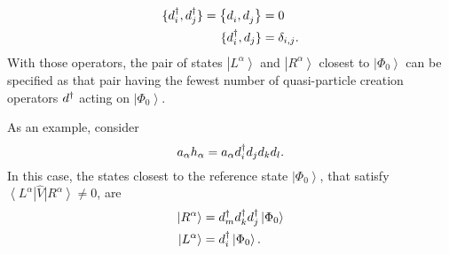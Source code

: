 \begin{align*}
\lbrace d_i^\dagger , d_j^\dagger \rbrace = \left\lbrace d_i^{}, d_j^{} \right\rbrace &= 0 \\
\lbrace d_i^\dagger , d_j \rbrace &= \delta_{i,j}.
\end{align*}
With those operators, the pair of states $\left| L^{\alpha} \right\rangle$ and $\left| R^{\alpha} \right\rangle$ 
closest to $\left| \Phi_0\right\rangle$ can be specified as that pair having the fewest number of quasi-particle creation operators $d^\dagger$ acting on $\left|\Phi_0\right\rangle$.

As an example, consider 
\[
a_{\alpha}h_{\alpha} = a_{\alpha} d_i^\dagger d_j d_k d_l.
\]
In this case, the states closest to the reference state $\left|\Phi_0\right\rangle$, that satisfy $\left\langle L^{\alpha} \right|\hat{V}\left| R^{\alpha} \right\rangle \neq 0$, are
\begin{align*}
\left|R^{\alpha}\right\rangle &= d_m^\dagger d_k^\dagger d_j^\dagger \left|\Phi_0\right\rangle \\
\left|L^{\alpha}\right\rangle &= d_i^\dagger \left| \Phi_0 \right\rangle.
\end{align*}
